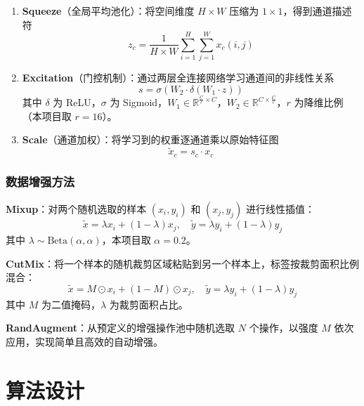 \documentclass[12pt,a4paper]{ctexart}
\begin{document}
\begin{enumerate}
    \item \textbf{Squeeze}（全局平均池化）：将空间维度 $H\times W$ 压缩为 $1\times1$，得到通道描述符
    \begin{equation}
        z_c = \frac{1}{H \times W} \sum_{i=1}^{H} \sum_{j=1}^{W} x_c(i, j)
    \end{equation}
    \item \textbf{Excitation}（门控机制）：通过两层全连接网络学习通道间的非线性关系
    \begin{equation}
        s = \sigma(W_2 \cdot \delta(W_1 \cdot z))
    \end{equation}
    其中 $\delta$ 为 ReLU，$\sigma$ 为 Sigmoid，$W_1 \in \mathbb{R}^{\frac{C}{r} \times C}$，$W_2 \in \mathbb{R}^{C \times \frac{C}{r}}$，$r$ 为降维比例（本项目取 $r=16$）。
    \item \textbf{Scale}（通道加权）：将学习到的权重逐通道乘以原始特征图
    \begin{equation}
        \tilde{x}_c = s_c \cdot x_c
    \end{equation}
\end{enumerate}

\subsubsection{数据增强方法}

\textbf{Mixup}：对两个随机选取的样本 $(x_i, y_i)$ 和 $(x_j, y_j)$ 进行线性插值：
\begin{equation}
    \tilde{x} = \lambda x_i + (1 - \lambda) x_j, \quad \tilde{y} = \lambda y_i + (1 - \lambda) y_j
\end{equation}
其中 $\lambda \sim \text{Beta}(\alpha, \alpha)$，本项目取 $\alpha=0.2$。

\textbf{CutMix}：将一个样本的随机裁剪区域粘贴到另一个样本上，标签按裁剪面积比例混合：
\begin{equation}
    \tilde{x} = M \odot x_i + (1 - M) \odot x_j, \quad \tilde{y} = \lambda y_i + (1 - \lambda) y_j
\end{equation}
其中 $M$ 为二值掩码，$\lambda$ 为裁剪面积占比。

\textbf{RandAugment}：从预定义的增强操作池中随机选取 $N$ 个操作，以强度 $M$ 依次应用，实现简单且高效的自动增强。


\section{算法设计}
\end{document}
